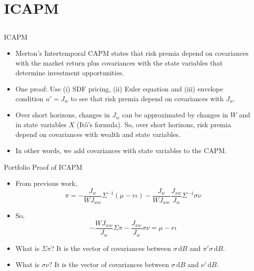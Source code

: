 \documentclass[10pt]{beamer}
\newcommand{\bi}{\begin{itemize}}
\newcommand{\ei}{\end{itemize}}
\newcommand{\im}{\item}
\newcommand{\D}{\mathrm{d}}
\begin{document}
\section{ICAPM}\subsection{}
\begin{frame}{ICAPM}
  \bi 
\im Merton's Intertemporal CAPM states that risk premia depend on covariances with the market return plus covariances with the state variables that determine investment opportunities.

\im One proof: Use (i) SDF pricing, (ii)  Euler equation and (iii) envelope condition $u' = J_w$ to see that risk premia depend on covariances with $J_w$.

\im Over short horizons, changes in $J_w$ can be approximated by changes in $W$ and in state variables $X$ (It\^o's formula).  So, over short horizons, risk premia depend on covariances with wealth and state variables.

\im In other words, we add covariances with state variables to the CAPM.
\ei
\end{frame}

\begin{frame}{Portfolio Proof of ICAPM}
  \bi 
\im From previous work,
$$\pi = -\frac{J_w}{WJ_{ww}}\Sigma^{-1}(\mu-r\iota)-\frac{J_w}{WJ_{ww}}\frac{J_{xw}}{J_w}\Sigma^{-1} \sigma\nu$$
\im So,
$$-\frac{WJ_{ww}}{J_w}\Sigma\pi - \frac{J_{xw}}{J_w}\sigma\nu = \mu-r\iota $$
\im What is $\Sigma\pi$? \pause It is the vector of covariances between $\sigma\,\D B$ and $\pi'\sigma\,\D B$.
\pause 
\im What is $\sigma\nu$? \pause It is the vector of covariances between $\sigma\,\D B$ and $\nu'\,\D B$.
\ei 
\end{frame}
\end{document}
